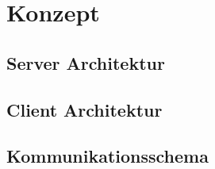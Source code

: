 \chapter{Konzept}

	\section{Server Architektur}
	
	\section{Client Architektur}
	
	\section{Kommunikationsschema}